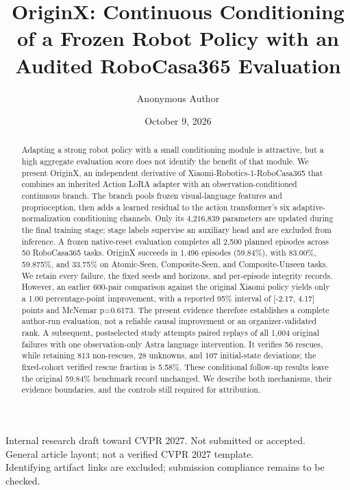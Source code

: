 \documentclass[10pt,twocolumn,letterpaper]{article}
\title{OriginX: Continuous Conditioning of a Frozen Robot Policy with an Audited RoboCasa365 Evaluation}
\author{Anonymous Author}
\date{October 9, 2026}
\begin{document}
\maketitle
\begin{center}\small
Internal research draft toward CVPR 2027. Not submitted or accepted.\\
General article layout; not a verified CVPR 2027 template.\\
Identifying artifact links are excluded; submission compliance remains to be checked.
\end{center}
\begin{abstract}

Adapting a strong robot policy with a small conditioning module is attractive, but a high aggregate evaluation score does not identify the benefit of that module. We present OriginX, an independent derivative of Xiaomi-Robotics-1-RoboCasa365 that combines an inherited Action LoRA adapter with an observation-conditioned continuous branch. The branch pools frozen visual-language features and proprioception, then adds a learned residual to the action transformer's six adaptive-normalization conditioning channels. Only its 4,216,839 parameters are updated during the final training stage; stage labels supervise an auxiliary head and are excluded from inference. A frozen native-reset evaluation completes all 2,500 planned episodes across 50 RoboCasa365 tasks. OriginX succeeds in 1,496 episodes (59.84\%), with 83.00\%, 59.875\%, and 33.75\% on Atomic-Seen, Composite-Seen, and Composite-Unseen tasks. We retain every failure, the fixed seeds and horizons, and per-episode integrity records. However, an earlier 600-pair comparison against the original Xiaomi policy yields only a 1.00 percentage-point improvement, with a reported 95\% interval of [-2.17, 4.17] points and McNemar p=0.6173. The present evidence therefore establishes a complete author-run evaluation, not a reliable causal improvement or an organizer-validated rank. A subsequent, postselected study attempts paired replays of all 1,004 original failures with one observation-only Astra language intervention. It verifies 56 rescues, while retaining 813 non-rescues, 28 unknowns, and 107 initial-state deviations; the fixed-cohort verified rescue fraction is 5.58\%. These conditional follow-up results leave the original 59.84\% benchmark record unchanged. We describe both mechanisms, their evidence boundaries, and the controls still required for attribution.


\end{abstract}
\end{document}
